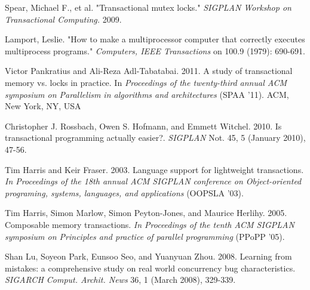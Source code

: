 \documentclass{sigplanconf}
\begin{document}
\begin{thebibliography}{}


  Spear, Michael F., et al. "Transactional mutex locks." \emph{SIGPLAN
    Workshop on Transactional Computing.} 2009.

  Lamport, Leslie. "How to make a multiprocessor computer that
  correctly executes multiprocess programs." \emph{Computers, IEEE
    Transactions} on 100.9 (1979): 690-691.

  Victor Pankratius and Ali-Reza Adl-Tabatabai. 2011. A study of
  transactional memory vs. locks in practice. In \emph{Proceedings of
    the twenty-third annual ACM symposium on Parallelism in algorithms
    and architectures} (SPAA '11). ACM, New York, NY, USA

  Christopher J. Rossbach, Owen S. Hofmann, and Emmett
  Witchel. 2010. Is transactional programming actually
  easier?. \emph{SIGPLAN} Not. 45, 5 (January 2010), 47-56.

  Tim Harris and Keir Fraser. 2003. Language support for lightweight
  transactions. \emph{In Proceedings of the 18th annual ACM SIGPLAN
    conference on Object-oriented programing, systems, languages, and
    applications} (OOPSLA '03).

  Tim Harris, Simon Marlow, Simon Peyton-Jones, and Maurice
  Herlihy. 2005. Composable memory transactions. \emph{In Proceedings
    of the tenth ACM SIGPLAN symposium on Principles and practice of
    parallel programming} (PPoPP '05).

  Shan Lu, Soyeon Park, Eunsoo Seo, and Yuanyuan Zhou. 2008. Learning
  from mistakes: a comprehensive study on real world concurrency bug
  characteristics. \emph{SIGARCH Comput. Archit. News} 36, 1 (March 2008),
  329-339.



\end{thebibliography}
\end{document}
